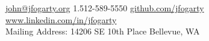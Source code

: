 \documentclass[10pt,letterpaper]{article}
\begin{document}
\sloppy  %



\nobreakvspace{0.3em}  %

\noindent\href{mailto:john.at.jfogarty.dot.org}{john\mbox{}@\mbox{}jfogarty.org}\sbull
\textsmaller{+}1.512-589-5550\sbull
\href{https://github.com/jfogarty}{github.com/jfogarty}
\sbull
\href{http://www.linkedin.com/in/jfogarty}{www.linkedin.com/in/jfogarty}
\\
Mailing Address: 14206 SE 10th Place\sbull
Bellevue, WA

\spacedhrule{0.9em}{-0.4em}  %

\end{document}
